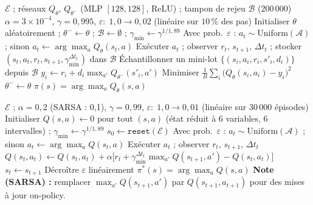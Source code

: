 \documentclass[11pt,a4paper]{article}
\begin{document}
\begin{algorithm}[H]
\caption{DQN pour le dispatching de camions miniers}
\label{alg:dqn}
\begin{algorithmic}[1]
\Require $\mathcal{E}$ ; réseaux $Q_\theta$, $Q_{\theta^-}$ (MLP $[128,128]$, ReLU) ; tampon de rejeu $\mathcal{B}$ (200\,000)
\Require $\alpha{=}3{\times}10^{-4}$, $\gamma{=}0{,}995$, $\varepsilon{:}\;1{,}0\!\to\!0{,}02$ (linéaire sur $10\,\%$ des pas)
\State Initialiser $\theta$ aléatoirement ; $\theta^-\leftarrow\theta$ ; $\mathcal{B}\leftarrow\emptyset$ ; $\gamma_{\min}\leftarrow\gamma^{1/1{,}89}$
  \State Avec prob.\ $\varepsilon$ : $a_t\sim\text{Uniform}(\mathcal{A})$ ; sinon $a_t\leftarrow\arg\max_a Q_\theta(s_t,a)$
  \State Exécuter $a_t$ ; observer $r_t$, $s_{t+1}$, $\Delta t_t$ ; stocker $(s_t,a_t,r_t,s_{t+1},\gamma_{\min}^{\Delta t_t})$ dans $\mathcal{B}$
  \State Échantillonner un mini-lot $\{(s_i,a_i,r_i,s'_i,d_i)\}$ depuis $\mathcal{B}$
  \State $y_i \leftarrow r_i + d_i\max_{a'}Q_{\theta^-}(s'_i,a')$ 
  \State Minimiser $\frac{1}{B}\sum_i\bigl(Q_\theta(s_i,a_i)-y_i\bigr)^2$
   $\theta^-\leftarrow\theta$ \EndIf {}
\EndFor
\Ensure $\pi(s)=\arg\max_a Q_\theta(s,a)$
\end{algorithmic}
\end{algorithm}

\begin{algorithm}[H]
\caption{Q-Learning pour le dispatching de camions miniers (référence tabulaire)}
\label{alg:qlearning}
\begin{algorithmic}[1]
\Require $\mathcal{E}$ ; $\alpha{=}0{,}2$ (SARSA : 0,1), $\gamma{=}0{,}99$, $\varepsilon{:}\;1{,}0\!\to\!0{,}01$ (linéaire sur 30\,000 épisodes)
\State Initialiser $Q(s,a)\leftarrow 0$ pour tout $(s,a)$ (état réduit à 6 variables, 6 intervalles) ; $\gamma_{\min}\leftarrow\gamma^{1/1{,}89}$
  \State $s_0\leftarrow\texttt{reset}(\mathcal{E})$
    \State Avec prob.\ $\varepsilon$ : $a_t\sim\text{Uniform}(\mathcal{A})$ ; sinon $a_t\leftarrow\arg\max_a Q(s_t,a)$
    \State Exécuter $a_t$ ; observer $r_t$, $s_{t+1}$, $\Delta t_t$
    \State $Q(s_t,a_t)\leftarrow Q(s_t,a_t)+\alpha\bigl[r_t+\gamma_{\min}^{\Delta t_t}\max_{a'}Q(s_{t+1},a')-Q(s_t,a_t)\bigr]$
    \State $s_t\leftarrow s_{t+1}$
  \EndWhile
  \State Décroître $\varepsilon$ linéairement
\EndFor
\Ensure $\pi^*(s)=\arg\max_a Q(s,a)$
\Statex \textbf{Note (SARSA) :} remplacer $\max_{a'}Q(s_{t+1},a')$ par $Q(s_{t+1},a_{t+1})$ pour des mises à jour on-policy.
\end{algorithmic}
\end{algorithm}
\end{document}
